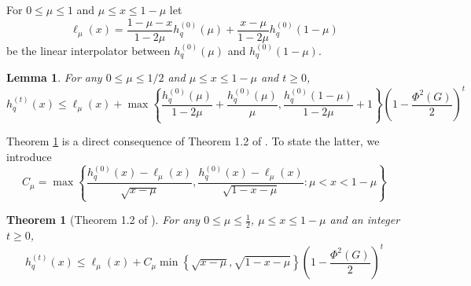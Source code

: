 \documentclass{article}
\newcommand{\set}[1]{\left\{#1\right\}}
\newcommand{\1}{\mathbf{1}}
\theoremstyle{aldenthm}
\newtheorem{theorem}{Theorem}
\newtheorem{lemma}{Lemma}
\theoremstyle{aldenrmrk}
\begin{document}
For $0 \leq \mu \leq 1$ and $\mu \leq x \leq 1 - \mu$ let 
\begin{equation*}
\ell_{\mu}(x) = \frac{1 - \mu - x}{1 - 2\mu} h_q^{(0)}(\mu) + \frac{x - \mu}{1 - 2\mu}h_q^{(0)}(1 - \mu)
\end{equation*}
be the linear interpolator between $h_q^{(0)}(\mu)$ and $h_q^{(0)}(1 - \mu)$. 

\begin{lemma}
	\label{lem: lt_ub}
	For any $0 \leq \mu \leq 1/2$ and $\mu \leq x \leq 1 - \mu$ and $t \geq 0$, 
	\begin{equation*}
	h_q^{(t)}(x) \leq \ell_{\mu}(x) + \max \set{\frac{h_q^{(0)}(\mu)}{1 - 2\mu} + \frac{h_q^{(0)}(\mu)}{\mu} , \frac{h_q^{(0)}(1 - \mu) }{1 - 2\mu} + 1 }\left(1 - \frac{\Phi^2(G)}{2}\right)^t
	\end{equation*}
\end{lemma}

Theorem \ref{lem: lt_ub} is a direct consequence of Theorem 1.2 of \cite{lovasz1990}. To state the latter, we introduce
\begin{equation*}
C_{\mu} = \max \set{\frac{h_q^{(0)}(x) - \ell_{\mu}(x)}{\sqrt{x - \mu}}, \frac{h_q^{(0)}(x) - \ell_{\mu}(x)}{\sqrt{1 - x - \mu}}: \mu < x < 1 - \mu}
\end{equation*}
\begin{theorem}[Theorem 1.2 of \cite{lovasz1990}]
	\label{thm: lovasz_simonovits_1993}
	For any $0 \leq \mu \leq \frac{1}{2}$, $\mu \leq x \leq 1 - \mu$ and an integer $t \geq 0$,
	\begin{equation*}
	h_q^{(t)}(x) \leq \ell_{\mu}(x) + C_{\mu} \min \set{\sqrt{x - \mu}, \sqrt{1 - x - \mu}} \left(1 - \frac{\Phi^2(G)}{2}\right)^t
	\end{equation*}
\end{theorem}
\end{document}
